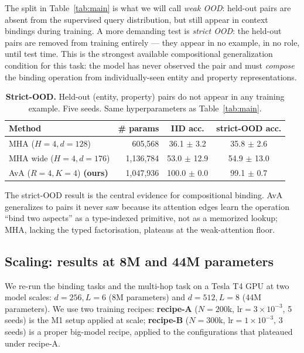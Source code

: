 \documentclass{article}
\begin{document}
The split in Table~\ref{tab:main} is what we will call \emph{weak OOD}:
held-out pairs are absent from the supervised query distribution, but
still appear in context bindings during training. A more demanding
test is \emph{strict OOD}: the held-out pairs are removed from
training entirely --- they appear in no example, in no role, until
test time. This is the strongest available compositional generalization
condition for this task: the model has never observed the pair and
must \emph{compose} the binding operation from individually-seen
entity and property representations.

\begin{table}[h]
\centering
\caption{\textbf{Strict-OOD.} Held-out (entity, property) pairs do
not appear in any training example. Five seeds. Same hyperparameters
as Table~\ref{tab:main}.}
\label{tab:strict}
\begin{tabular}{lrcc}
\toprule
Method & \# params & IID acc. & strict-OOD acc. \\
\midrule
MHA ($H{=}4, d{=}128$)  & 605,568  & 36.1 $\pm$ 3.2  & 35.8 $\pm$ 2.6 \\
MHA wide ($H{=}4, d{=}176$)  & 1,136,784  & 53.0 $\pm$ 12.9  & 54.9 $\pm$ 13.0 \\
AvA ($R{=}4, K{=}4$) \textbf{(ours)}  & 1,047,936  & 100.0 $\pm$ 0.0  & 99.1 $\pm$ 0.7 \\
\bottomrule
\end{tabular}
\end{table}

The strict-OOD result is the central evidence for compositional
binding. AvA generalizes to pairs it never saw because its
attention edges learn the operation ``bind two aspects'' as a
type-indexed primitive, not as a memorized lookup; MHA, lacking the
typed factorisation, plateaus at the weak-attention floor.



\subsection{Scaling: results at 8M and 44M parameters}
\label{sec:scaling}

We re-run the binding tasks and the multi-hop task on a Tesla T4
GPU at two model scales: $d{=}256, L{=}6$ (8M parameters) and
$d{=}512, L{=}8$ (44M parameters). We use two training recipes:
\textbf{recipe-A} ($N{=}200$k, $\mathrm{lr}{=}3\!\times\!10^{-3}$,
5 seeds) is the M1 setup applied at scale; \textbf{recipe-B}
($N{=}300$k, $\mathrm{lr}{=}1\!\times\!10^{-3}$, 3 seeds) is a
proper big-model recipe, applied to the configurations that
plateaued under recipe-A.
\end{document}
